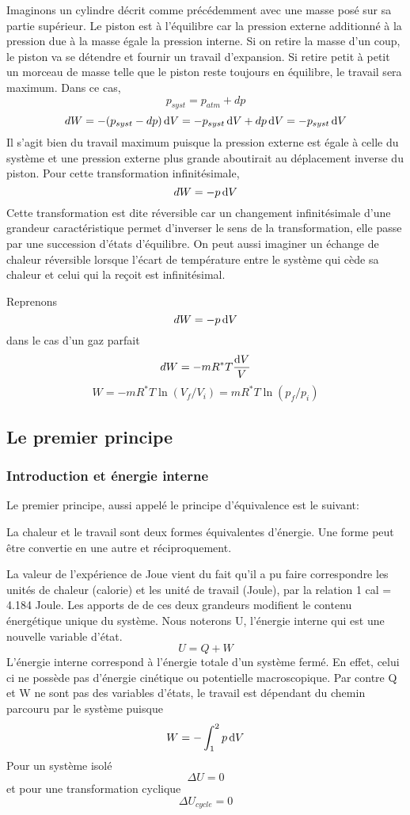 Imaginons un cylindre décrit comme précédemment
avec une masse posé sur sa partie supérieur.
Le piston est à l'équilibre car la pression externe
additionné à la pression due à la masse égale la pression interne.
Si on retire la masse d'un coup,
le piston va se détendre et fournir un travail d'expansion.
Si retire petit à petit un morceau de masse telle
que le piston reste toujours en équilibre, le travail sera maximum.
Dans ce cas,
\[ p_{syst} = p_{atm}+dp \]
\[ dW = -(p_{syst} -dp) \operatorname{d}\! V = -p_{syst}\operatorname{d}\! V+dp\operatorname{d}\! V = -p_{syst}\operatorname{d}\! V \]
Il s'agit bien du travail maximum puisque la pression externe est
égale à celle du système et une pression externe
plus grande aboutirait au déplacement inverse du piston.
Pour cette transformation infinitésimale,
\[ dW = -p\operatorname{d}\! V \]
Cette transformation est dite réversible car un changement infinitésimale
d'une grandeur caractéristique permet d'inverser le sens de la transformation,
elle passe par une succession d'états d'équilibre.
On peut aussi imaginer un échange de chaleur réversible lorsque
l'écart de température entre le système qui cède sa chaleur et
celui qui la reçoit est infinitésimal.

Reprenons
\[ dW = -p\operatorname{d}\! V \]
dans le cas d'un gaz parfait
\[ dW = -mR^*T\frac{\operatorname{d}\! V}V \]
\[ W = -mR^*T \ln(V_f/V_i) = mR^*T \ln(p_f/p_i) \]

\subsection{Le premier principe}
\subsubsection{Introduction et énergie interne}
Le premier principe, aussi appelé le principe d'équivalence est le suivant:

La chaleur et le travail sont deux formes équivalentes d'énergie.
Une forme peut être convertie en une autre et réciproquement.

La valeur de l'expérience de Joue vient du fait qu'il a pu
faire correspondre les unités de chaleur (calorie) et
les unité de travail (Joule), par la relation 1 cal = 4.184 Joule.
Les apports de de ces deux grandeurs modifient
le contenu énergétique unique du système.
Nous noterons U, l'énergie interne qui est une nouvelle variable d'état.
\[ U = Q+W \]
L'énergie interne correspond à l'énergie totale d'un système fermé.
En effet, celui ci ne possède pas d'énergie cinétique ou
potentielle macroscopique.
Par contre Q et W ne sont pas des variables d'états,
le travail est dépendant du chemin parcouru par le système puisque
\[W = - \int_1^2p\operatorname{d}\! V \]
Pour un système isolé
\[ \Delta U = 0 \]
et pour une transformation cyclique
\[ \Delta U_{cycle} = 0 \]

